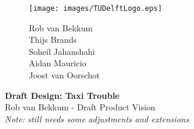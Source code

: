 \documentclass[11pt]{article}
\begin{document}
\begin{figure}
    \begin{minipage}[H]{0.33\textwidth}
		\vspace{0.3cm}
		\texttt{[image: images/TUDelftLogo.eps]}
	\end{minipage}
	\begin{minipage}[H]{0.33\textwidth}
		\begin{center}
			
		\end{center}
		
		\begin{center}
			
		
		\end{center}
	\end{minipage}
	\begin{minipage}[H]{0.33\textwidth}
			\begin{flushright}
				\small{Rob van Bekkum }\\
				\small{Thijs Brands }\\
				\small{Soheil Jahanshahi }\\
				\small{Aidan Mauricio }\\
				\small{Joost van Oorschot }

			\end{flushright}
			
	\end{minipage}
\end{figure}

\begin{minipage}[H]{\textwidth}
\vspace{0.3cm}
		\begin{center}
		\vspace{0.3cm}
			\Huge{\textbf{Draft Design: Taxi Trouble}}\\
			\vspace{0.3cm}
			\large Rob van Bekkum - Draft Product Vision \\
			\textit{Note: still needs some adjustments and extensions}
		\vspace{0.3cm}	
		\vspace{0.7cm}	
		\end{center}
	\end{minipage}
	
\end{document}
